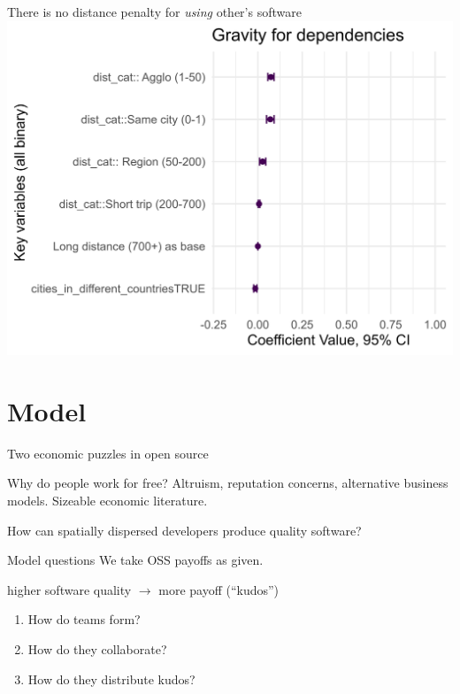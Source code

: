 \documentclass[
  ignorenonframetext,
  aspectratio=169,
]{beamer}
\providecommand{\tightlist}{%
  \setlength{\itemsep}{0pt}\setlength{\parskip}{0pt}}
\begin{document}
\begin{frame}{There is no distance penalty for \emph{using} other's
software}
\protect\hypertarget{there-is-no-distance-penalty-for-using-others-software}{}
\includegraphics{figures/gravity_dependencies2.png}
\end{frame}

\section{Model}\label{model}

\begin{frame}{Two economic puzzles in open source}
\protect\hypertarget{two-economic-puzzles-in-open-source}{}
\begin{block}{Why do people work for free?}
\protect\hypertarget{why-do-people-work-for-free}{}
Altruism, reputation concerns, alternative business models. Sizeable
economic literature.
\end{block}

\begin{block}{How can spatially dispersed developers produce quality
software?}
\protect\hypertarget{how-can-spatially-dispersed-developers-produce-quality-software}{}
\end{block}
\end{frame}

\begin{frame}{Model questions}
\protect\hypertarget{model-questions}{}
We take OSS payoffs as given.

higher software quality \(\to\) more payoff (``kudos'')

\begin{enumerate}
\tightlist
\item
  How do teams form?
\item
  How do they collaborate?
\item
  How do they distribute kudos?
\end{enumerate}
\end{frame}
\end{document}
